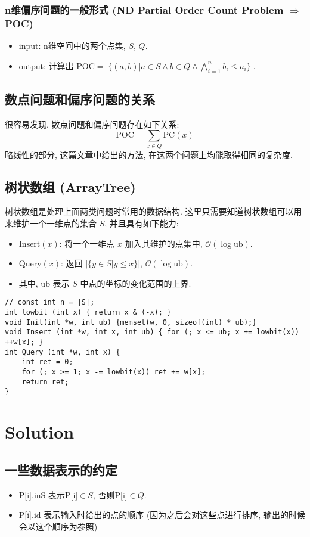 \documentclass[11pt]{article}
\begin{document}
\subsubsection{n维偏序问题的一般形式 (ND Partial Order Count Problem \(\Rightarrow\) POC)}
\label{sec:org02dc34c}
\begin{itemize}
\item input: n维空间中的两个点集, \(S\), \(Q\).
\item output: 计算出 \(\mbox{POC} = |\{ (a, b) | a\in S\land b\in Q\land\bigwedge_{i=1}^n b_i\leq a_i\}|\).
\end{itemize}
\subsection{数点问题和偏序问题的关系}
\label{sec:org052bb80}
很容易发现, 数点问题和偏序问题存在如下关系:
\[
    \mbox{POC} = \sum_{x \in Q} \mbox{PC}(x)
   \]
略线性的部分, 这篇文章中给出的方法, 在这两个问题上均能取得相同的复杂度.
\subsection{树状数组 (ArrayTree)}
\label{sec:orgb92d1a3}
树状数组是处理上面两类问题时常用的数据结构.
这里只需要知道树状数组可以用来维护一个一维点的集合 \(S\), 并且具有如下能力:
\begin{itemize}
\item \(\mbox{Insert}(x)\): 将一个一维点 \(x\) 加入其维护的点集中, \(\mathcal{O}(\log \mbox{ub})\).
\item \(\mbox{Query}(x)\): 返回 \(|\{y\in S| y\leq x\}|\), \(\mathcal{O}(\log \mbox{ub})\).
\item 其中, \(\mbox{ub}\) 表示 \(S\) 中点的坐标的变化范围的上界.
\end{itemize}
\begin{verbatim}
// const int n = |S|;
int lowbit (int x) { return x & (-x); }
void Init(int *w, int ub) {memset(w, 0, sizeof(int) * ub);}
void Insert (int *w, int x, int ub) { for (; x <= ub; x += lowbit(x)) ++w[x]; }
int Query (int *w, int x) { 
    int ret = 0;
    for (; x >= 1; x -= lowbit(x)) ret += w[x];
    return ret;
}
\end{verbatim}

\section{Solution}
\label{sec:org6603dcd}
\subsection{一些数据表示的约定}
\label{sec:org7aa21fc}
\begin{itemize}
\item P[i].inS 表示P[i]\(\in S\), 否则P[i]\(\in Q\).
\item P[i].id 表示输入时给出的点的顺序 (因为之后会对这些点进行排序, 输出的时候会以这个顺序为参照)
\end{itemize}
\end{document}
